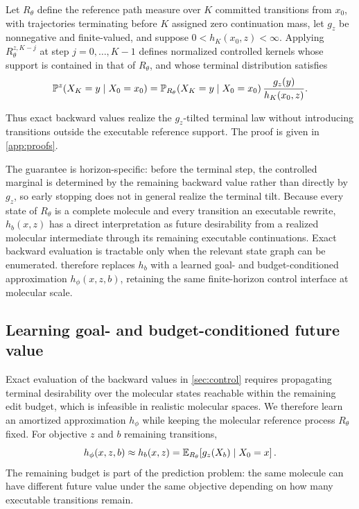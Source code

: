 \begin{theorem}
\label{thm:doob}
Let $R_\theta$ define the reference path measure over $K$ committed transitions from $x_0$, with trajectories terminating before $K$ assigned zero continuation mass, let $g_z$ be nonnegative and finite-valued, and suppose $0<h_K(x_0,z)<\infty$. Applying $R_\theta^{z,K-j}$ at step $j=0,\dots,K-1$ defines normalized controlled kernels whose support is contained in that of $R_\theta$, and whose terminal distribution satisfies
\begin{equation}
\mathbb{P}^{z}(X_K=y\mid X_0=x_0)=\mathbb{P}_{R_\theta}(X_K=y\mid X_0=x_0)\,\frac{g_z(y)}{h_K(x_0,z)}.
\label{eq:tilt}
\end{equation}
\end{theorem}

Thus exact backward values realize the $g_z$-tilted terminal law without introducing transitions outside the executable reference support. The proof is given in \cref{app:proofs}.

The guarantee is horizon-specific: before the terminal step, the controlled marginal is determined by the remaining backward value rather than directly by $g_z$, so early stopping does not in general realize the terminal tilt. Because every state of $R_\theta$ is a complete molecule and every transition an executable rewrite, $h_b(x,z)$ has a direct interpretation as future desirability from a realized molecular intermediate through its remaining executable continuations. Exact backward evaluation is tractable only when the relevant state graph can be enumerated.  therefore replaces $h_b$ with a learned goal- and budget-conditioned approximation $h_\phi(x,z,b)$, retaining the same finite-horizon control interface at molecular scale.

\subsection{Learning goal- and budget-conditioned future value}
\label{sec:hphi}

Exact evaluation of the backward values in \cref{sec:control} requires propagating terminal desirability over the molecular states reachable within the remaining edit budget, which is infeasible in realistic molecular spaces. We therefore learn an amortized approximation $h_\phi$ while keeping the molecular reference process $R_\theta$ fixed. For objective $z$ and $b$ remaining transitions,
\begin{equation}
h_\phi(x,z,b)\approx h_b(x,z)=\mathbb{E}_{R_\theta}\!\left[g_z(X_b)\mid X_0=x\right].
\label{eq:hphi}
\end{equation}
The remaining budget is part of the prediction problem: the same molecule can have different future value under the same objective depending on how many executable transitions remain.

